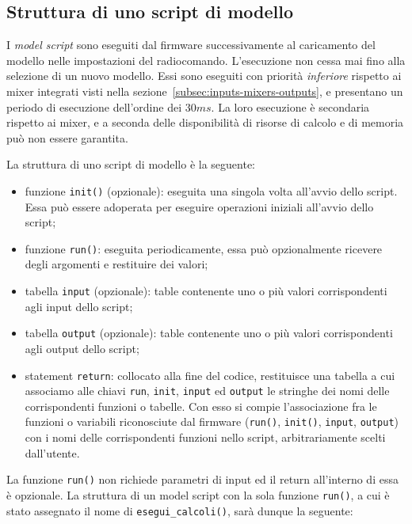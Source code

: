 \documentclass[a4paper, 12pt]{report}
\begin{document}
\subsection{Struttura di uno script di modello}\label{subsec:struttura-script-modello}
I \emph{model script} sono eseguiti dal firmware successivamente al caricamento del modello nelle impostazioni del radiocomando. L'esecuzione non cessa mai fino alla selezione di un nuovo modello. Essi sono eseguiti con priorità \emph{inferiore} rispetto ai mixer integrati visti nella sezione~\ref{subsec:inputs-mixers-outputs}, e presentano un periodo di esecuzione dell'ordine dei $30ms$. La loro esecuzione è secondaria rispetto ai mixer, e a seconda delle disponibilità di risorse di calcolo e di memoria può non essere garantita.

La struttura di uno script di modello è la seguente:
\begin{itemize}
        \item funzione \texttt{init()} (opzionale): eseguita una singola volta all'avvio dello script. Essa può essere adoperata per eseguire operazioni iniziali all'avvio dello script;
        \item funzione \texttt{run()}: eseguita periodicamente, essa può opzionalmente ricevere degli argomenti e restituire dei valori;
        \item tabella \texttt{input} (opzionale): table contenente uno o più valori corrispondenti agli input dello script;
        \item tabella \texttt{output} (opzionale): table contenente uno o più valori corrispondenti agli output dello script;
        \item statement \texttt{return}: collocato alla fine del codice, restituisce una tabella a cui associamo alle chiavi \texttt{run}, \texttt{init}, \texttt{input} ed \texttt{output} le stringhe dei nomi delle corrispondenti funzioni o tabelle. Con esso si compie l'associazione fra le funzioni o variabili riconosciute dal firmware (\texttt{run()}, \texttt{init()}, \texttt{input}, \texttt{output}) con i nomi delle corrispondenti funzioni nello script, arbitrariamente scelti dall'utente.
\end{itemize}

La funzione \texttt{run()} non richiede parametri di input ed il return all'interno di essa è opzionale. La struttura di un model script con la sola funzione \texttt{run()}, a cui è stato assegnato il nome di \texttt{esegui\_calcoli()}, sarà dunque la seguente:
\end{document}
